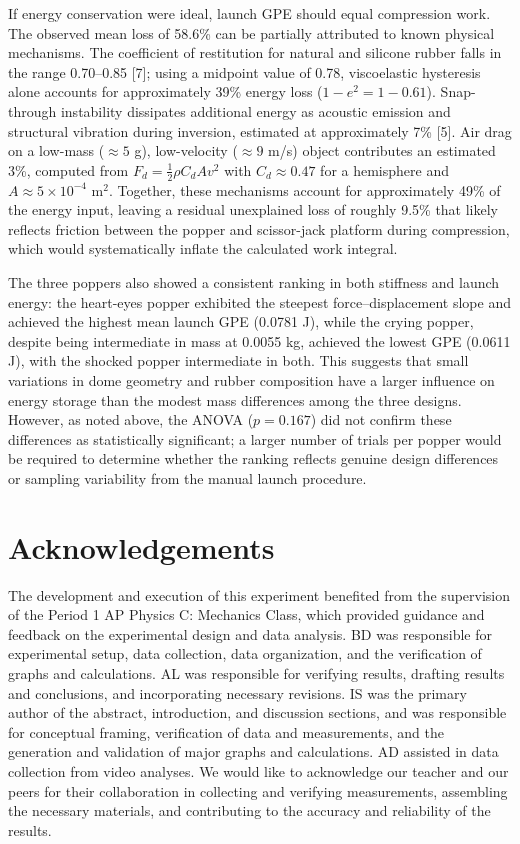 \documentclass[12pt]{article}
\begin{document}
If energy conservation were ideal, launch GPE should equal compression work. The observed mean loss of 58.6\% can be partially attributed to known physical mechanisms. The coefficient of restitution for natural and silicone rubber falls in the range 0.70--0.85 [7]; using a midpoint value of 0.78, viscoelastic hysteresis alone accounts for approximately 39\% energy loss ($1 - e^2 = 1 - 0.61$). Snap-through instability dissipates additional energy as acoustic emission and structural vibration during inversion, estimated at approximately 7\% [5]. Air drag on a low-mass ($\approx 5$ g), low-velocity ($\approx 9$ m/s) object contributes an estimated 3\%, computed from $F_d = \frac{1}{2}\rho C_d A v^2$ with $C_d \approx 0.47$ for a hemisphere and $A \approx 5 \times 10^{-4}$ m$^2$. Together, these mechanisms account for approximately 49\% of the energy input, leaving a residual unexplained loss of roughly 9.5\% that likely reflects friction between the popper and scissor-jack platform during compression, which would systematically inflate the calculated work integral.

The three poppers also showed a consistent ranking in both stiffness and launch energy: the heart-eyes popper exhibited the steepest force--displacement slope and achieved the highest mean launch GPE (0.0781 J), while the crying popper, despite being intermediate in mass at 0.0055 kg, achieved the lowest GPE (0.0611 J), with the shocked popper intermediate in both. This suggests that small variations in dome geometry and rubber composition have a larger influence on energy storage than the modest mass differences among the three designs. However, as noted above, the ANOVA ($p = 0.167$) did not confirm these differences as statistically significant; a larger number of trials per popper would be required to determine whether the ranking reflects genuine design differences or sampling variability from the manual launch procedure.

\section{Acknowledgements}
The development and execution of this experiment benefited from the supervision of the Period 1 AP Physics C: Mechanics Class, which provided guidance and feedback on the experimental design and data analysis. BD was responsible for experimental setup, data collection, data organization, and the verification of graphs and calculations. AL was responsible for verifying results, drafting results and conclusions, and incorporating necessary revisions. IS was the primary author of the abstract, introduction, and discussion sections, and was responsible for conceptual framing, verification of data and measurements, and the generation and validation of major graphs and calculations. AD assisted in data collection from video analyses. We would like to acknowledge our teacher and our peers for their collaboration in collecting and verifying measurements, assembling the necessary materials, and contributing to the accuracy and reliability of the results.
\end{document}
